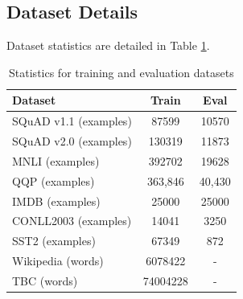 \subsection{Dataset Details}
\label{sec:datasets}
Dataset statistics are detailed in Table \ref{tab:dataset_stat}.
\begin{table}[!htb]
      \centering
         {\small 
             \begin{tabular}{l|c|c}
                \toprule 
                Dataset & Train & Eval \\
                \midrule
                SQuAD v1.1 (examples) &  87599 & 10570\\
                SQuAD v2.0 (examples) &  130319	 & 11873\\
                \midrule
                MNLI (examples) & 392702 & 19628 \\
                \midrule
                QQP (examples) &  363,846 & 40,430 \\
                \midrule
                IMDB (examples) & 25000	 & 25000 \\
                \midrule
                CONLL2003 (examples) & 14041	 & 3250 \\
                \midrule
                SST2 (examples) & 67349	 & 872	 \\
                \midrule
                Wikipedia (words) & 6078422  & - \\
                \midrule
                TBC (words) & 74004228 & - \\ 
                \bottomrule
            \end{tabular}
         }
     \caption{Statistics for training and evaluation datasets}
    \label{tab:dataset_stat}
\end{table}
